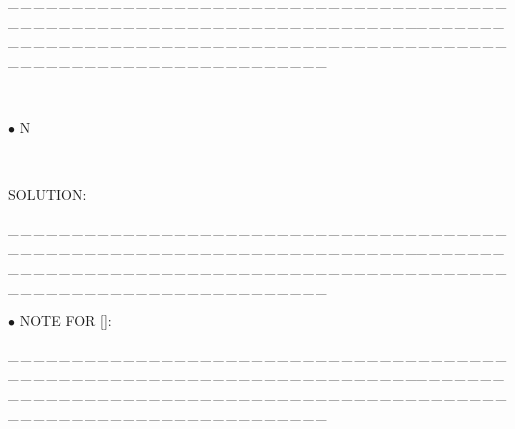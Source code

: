 \documentclass[a4paper, 11pt, UTF8]{article}
\begin{document}
\begin{large}
\par
{\tiny \_\,\_\,\_\,\_\,\_\,\_\,\_\,\_\,\_\,\_\,\_\,\_\,\_\,\_\,\_\,\_\,\_\,\_\,\_\,\_\,\_\,\_\,\_\,\_\,\_\,\_\,\_\,\_\,\_\,\_\,\_\,\_\,\_\,\_\,\_\,\_\,\_\,\_\,\_\,\_\,\_\,\_\,\_\,\_\,\_\,\_\,\_\,\_\,\_\,\_\,\_\,\_\,\_\,\_\,\_\,\_\,\_\,\_\,\_\,\_\,\_\,\_\,\_\,\_\,\_\,\_\,\_\,\_\,\_\,\_\,\_\_\,\_\,\_\,\_\,\_\,\_\,\_\,\_\,\_\,\_\,\_\,\_\,\_\,\_\,\_\,\_\,\_\,\_\,\_\,\_\,\_\,\_\,\_\,\_\,\_\,\_\,\_\,\_\,\_\,\_\,\_\,\_\,\_\,\_\,\_\,\_\,\_\,\_\,\_\,\_\,\_\,\_\,\_\,\_\,\_\,\_\,\_\,\_\,\_\,\_\,\_\,\_\,\_\,\_\,\_\,\_\,\_\,\_\,\_\,\_\,\_\,\_\,\_\,\_\,\_\,\_\,\_\,\_\,\_\,\_\,\_}\par

\par{\tiny\,\par}

{\small $\bullet$}
{\timesbf\Large N} {\timessl\Large 
}\par\quad\,
{\timessl\Large
}\par
{\timesbf S\footnotesize{OLUTION:}}\par\quad

\par
{\tiny \_\,\_\,\_\,\_\,\_\,\_\,\_\,\_\,\_\,\_\,\_\,\_\,\_\,\_\,\_\,\_\,\_\,\_\,\_\,\_\,\_\,\_\,\_\,\_\,\_\,\_\,\_\,\_\,\_\,\_\,\_\,\_\,\_\,\_\,\_\,\_\,\_\,\_\,\_\,\_\,\_\,\_\,\_\,\_\,\_\,\_\,\_\,\_\,\_\,\_\,\_\,\_\,\_\,\_\,\_\,\_\,\_\,\_\,\_\,\_\,\_\,\_\,\_\,\_\,\_\,\_\,\_\,\_\,\_\,\_\,\_\_\,\_\,\_\,\_\,\_\,\_\,\_\,\_\,\_\,\_\,\_\,\_\,\_\,\_\,\_\,\_\,\_\,\_\,\_\,\_\,\_\,\_\,\_\,\_\,\_\,\_\,\_\,\_\,\_\,\_\,\_\,\_\,\_\,\_\,\_\,\_\,\_\,\_\,\_\,\_\,\_\,\_\,\_\,\_\,\_\,\_\,\_\,\_\,\_\,\_\,\_\,\_\,\_\,\_\,\_\,\_\,\_\,\_\,\_\,\_\,\_\,\_\,\_\,\_\,\_\,\_\,\_\,\_\,\_\,\_\,\_}\par

{\small $\bullet$} {\timesbf\Large N{\normalsize OTE} F{\normalsize OR} []:}
\par
{\tiny \_\,\_\,\_\,\_\,\_\,\_\,\_\,\_\,\_\,\_\,\_\,\_\,\_\,\_\,\_\,\_\,\_\,\_\,\_\,\_\,\_\,\_\,\_\,\_\,\_\,\_\,\_\,\_\,\_\,\_\,\_\,\_\,\_\,\_\,\_\,\_\,\_\,\_\,\_\,\_\,\_\,\_\,\_\,\_\,\_\,\_\,\_\,\_\,\_\,\_\,\_\,\_\,\_\,\_\,\_\,\_\,\_\,\_\,\_\,\_\,\_\,\_\,\_\,\_\,\_\,\_\,\_\,\_\,\_\,\_\,\_\_\,\_\,\_\,\_\,\_\,\_\,\_\,\_\,\_\,\_\,\_\,\_\,\_\,\_\,\_\,\_\,\_\,\_\,\_\,\_\,\_\,\_\,\_\,\_\,\_\,\_\,\_\,\_\,\_\,\_\,\_\,\_\,\_\,\_\,\_\,\_\,\_\,\_\,\_\,\_\,\_\,\_\,\_\,\_\,\_\,\_\,\_\,\_\,\_\,\_\,\_\,\_\,\_\,\_\,\_\,\_\,\_\,\_\,\_\,\_\,\_\,\_\,\_\,\_\,\_\,\_\,\_\,\_\,\_\,\_\,\_}\par


\end{large}
\end{document}
